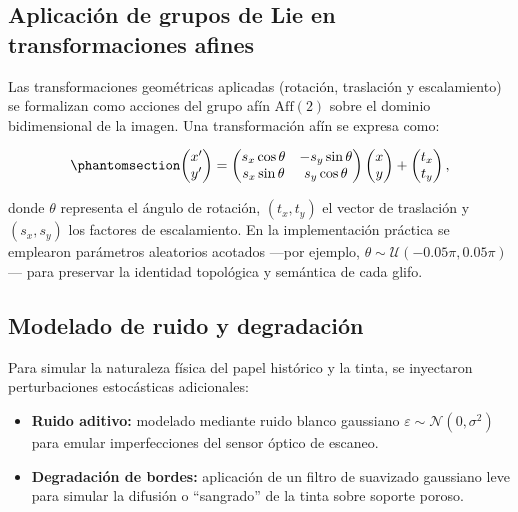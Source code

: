 \documentclass[
  spanish,
  us-letterpaper,
]{scrreprt}
\providecommand{\tightlist}{%
  \setlength{\itemsep}{0pt}\setlength{\parskip}{0pt}}
\theoremstyle{definition}
\theoremstyle{remark}
\begin{document}
\subsection{Aplicación de grupos de Lie en transformaciones
afines}\label{aplicaciuxf3n-de-grupos-de-lie-en-transformaciones-afines}

Las transformaciones geométricas aplicadas (rotación, traslación y
escalamiento) se formalizan como acciones del grupo afín
\(\mathrm{Aff}(2)\) sobre el dominio bidimensional de la imagen. Una
transformación afín se expresa como:

\begin{equation}\phantomsection\label{eq-transformacion-afin}{\begin{pmatrix} x' \\ y' \end{pmatrix} = \begin{pmatrix} s_x \cos\theta & -s_y \sin\theta \\ s_x \sin\theta & s_y \cos\theta \end{pmatrix} \begin{pmatrix} x \\ y \end{pmatrix} + \begin{pmatrix} t_x \\ t_y \end{pmatrix},}\end{equation}

donde \(\theta\) representa el ángulo de rotación, \((t_x, t_y)\) el
vector de traslación y \((s_x, s_y)\) los factores de escalamiento. En
la implementación práctica se emplearon parámetros aleatorios acotados
---por ejemplo, \(\theta \sim \mathcal{U}(-0.05\pi, 0.05\pi)\)--- para
preservar la identidad topológica y semántica de cada glifo.

\subsection{Modelado de ruido y
degradación}\label{modelado-de-ruido-y-degradaciuxf3n}

Para simular la naturaleza física del papel histórico y la tinta, se
inyectaron perturbaciones estocásticas adicionales:

\begin{itemize}
\tightlist
\item
  \textbf{Ruido aditivo:} modelado mediante ruido blanco gaussiano
  \(\varepsilon \sim \mathcal{N}(0, \sigma^2)\) para emular
  imperfecciones del sensor óptico de escaneo.
\item
  \textbf{Degradación de bordes:} aplicación de un filtro de suavizado
  gaussiano leve para simular la difusión o ``sangrado'' de la tinta
  sobre soporte poroso.
\end{itemize}
\end{document}
